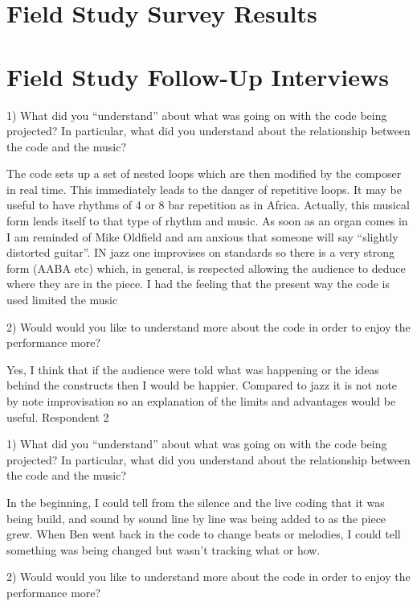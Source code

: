 
\appendix

\chapter{Field Study Survey Results}

\chapter{Field Study Follow-Up Interviews}

1) What did you ``understand'' about what was going on with the code being projected? In particular, what did you understand about the relationship between the code and the music?

The code sets up a set of nested loops which are then modified by the composer in real time. This immediately leads to the danger of repetitive loops. It may be useful to have rhythms of 4 or 8 bar repetition as in Africa. Actually, this musical form lends itself to that type of rhythm and music. As soon as an organ comes in I am reminded of Mike Oldfield and am anxious that someone will say “slightly distorted guitar”. IN jazz one improvises on standards so there is a very strong form (AABA etc) which, in general, is respected allowing the audience to deduce where they are in the piece. I had the feeling that the present way the code is used limited the music

2) Would would you like to understand more about the code in order to enjoy the performance more?

Yes, I think that if the audience were told what was happening or the ideas behind the constructs then I would be happier. Compared to jazz it is not note by note improvisation so an explanation of the limits and advantages would be useful.
Respondent 2

1) What did you ``understand'' about what was going on with the code being projected? In particular, what did you understand about the relationship between the code and the music?

In the beginning, I could tell from the silence and the live coding that it was being build, and sound by sound line by line was being added to as the piece grew.  When Ben went back in the code to change beats or melodies, I could tell something was being changed but wasn't tracking what or how.

2) Would would you like to understand more about the code in order to enjoy the performance more?


